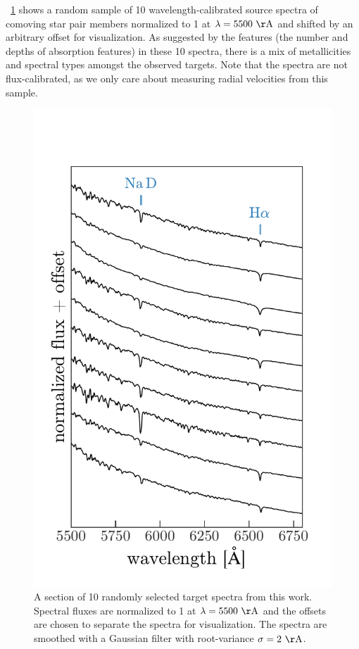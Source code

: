\documentclass[modern, letterpaper]{aastex61}
\begin{document}
\figurename~\ref{fig:sample-spectra} shows a random sample of 10
wavelength-calibrated source spectra of comoving star pair members normalized
to 1 at $\lambda = 5500~{\rm \AA}$ and shifted by an arbitrary offset for
visualization.
As suggested by the features (the number and depths of absorption features) in
these 10 spectra, there is a mix of metallicities and spectral types amongst the
observed targets.
Note that the spectra are not flux-calibrated, as we only care about measuring
radial velocities from this sample.

\begin{figure}[htbp]
  \begin{center}
    \includegraphics[width=0.6\linewidth]{sample_spectra.pdf}
  \end{center}
  \caption{%
    A section of 10 randomly selected target spectra from this work.
    Spectral fluxes are normalized to 1 at $\lambda = 5500~{\rm \AA}$ and the
    offsets are chosen to separate the spectra for visualization.
    The spectra are smoothed with a Gaussian filter with root-variance $\sigma
    = 2~{\rm \AA}$.
    \label{fig:sample-spectra}}
\end{figure}
\end{document}
